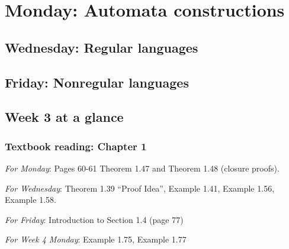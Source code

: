 \newpage

\section*{Monday: Automata constructions}


    
\newpage
\subsection*{Wednesday: Regular languages}




\newpage
\subsection*{Friday: Nonregular languages}



\newpage

\subsection*{Week 3 at a glance}

\subsubsection*{Textbook reading: Chapter 1}

{\it For Monday}: Pages 60-61 Theorem 1.47 and Theorem 1.48 (closure proofs).

{\it For Wednesday}: Theorem 1.39 ``Proof Idea'', Example 1.41, Example 1.56, Example 1.58.

{\it For Friday}: Introduction to Section 1.4 (page 77)

{\it For Week 4 Monday}: Example 1.75, Example 1.77

